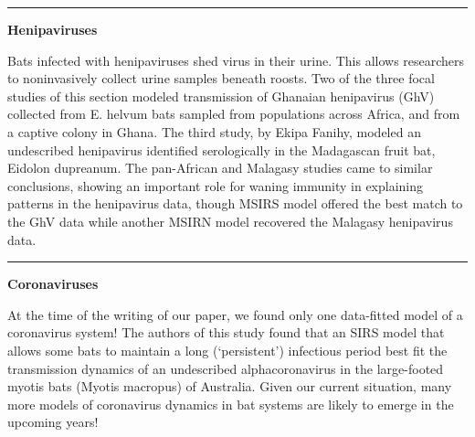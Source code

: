 \documentclass[
]{article}
\begin{document}
\begin{center}\rule{0.5\linewidth}{0.5pt}\end{center}

\textbf{Henipaviruses}

Bats infected with henipaviruses shed virus in their urine. This allows
researchers to noninvasively collect urine samples beneath roosts. Two
of the three focal studies of this section modeled transmission of
Ghanaian henipavirus (GhV) collected from E. helvum bats sampled from
populations across Africa, and from a captive colony in Ghana. The third
study, by Ekipa Fanihy, modeled an undescribed henipavirus identified
serologically in the Madagascan fruit bat, Eidolon dupreanum. The
pan-African and Malagasy studies came to similar conclusions, showing an
important role for waning immunity in explaining patterns in the
henipavirus data, though MSIRS model offered the best match to the GhV
data while another MSIRN model recovered the Malagasy henipavirus data.

\begin{center}\rule{0.5\linewidth}{0.5pt}\end{center}

\textbf{Coronaviruses}

At the time of the writing of our paper, we found only one data-fitted
model of a coronavirus system! The authors of this study found that an
SIRS model that allows some bats to maintain a long (`persistent')
infectious period best fit the transmission dynamics of an undescribed
alphacoronavirus in the large-footed myotis bats (Myotis macropus) of
Australia. Given our current situation, many more models of coronavirus
dynamics in bat systems are likely to emerge in the upcoming years!
\end{document}
